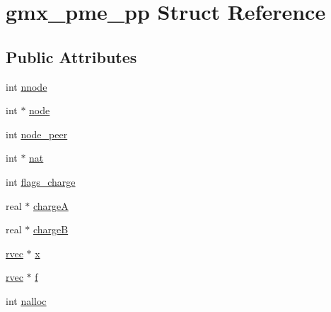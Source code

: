 \hypertarget{structgmx__pme__pp}{\section{gmx\-\_\-pme\-\_\-pp \-Struct \-Reference}
\label{structgmx__pme__pp}
}
\subsection*{\-Public \-Attributes}
\begin{DoxyCompactItemize}
\item 
int \hyperlink{structgmx__pme__pp_ab8beb115201c2ca17a30bec941a866d2}{nnode}
\item 
int $\ast$ \hyperlink{structgmx__pme__pp_a8d8cf41544555e7c99385052e2afeebd}{node}
\item 
int \hyperlink{structgmx__pme__pp_a7ae7bd537376241cf862eecf7b86a39a}{node\-\_\-peer}
\item 
int $\ast$ \hyperlink{structgmx__pme__pp_a58221d0c707a3622d907527000e6c75d}{nat}
\item 
int \hyperlink{structgmx__pme__pp_a13e02cc138161f3d52c5ca7fa4af5280}{flags\-\_\-charge}
\item 
real $\ast$ \hyperlink{structgmx__pme__pp_ac8202a8f1a26579ee141d6ecb80e35a6}{charge\-A}
\item 
real $\ast$ \hyperlink{structgmx__pme__pp_a378c9b6ed40e9091972501eee6b521d4}{charge\-B}
\item 
\hyperlink{share_2template_2gromacs_2types_2simple_8h_aa02a552a4abd2f180c282a083dc3a999}{rvec} $\ast$ \hyperlink{structgmx__pme__pp_a7edcbe9e32d13e50736c60a9f0b0382b}{x}
\item 
\hyperlink{share_2template_2gromacs_2types_2simple_8h_aa02a552a4abd2f180c282a083dc3a999}{rvec} $\ast$ \hyperlink{structgmx__pme__pp_ab340cc7c9907fb6aad9d430a73193603}{f}
\item 
int \hyperlink{structgmx__pme__pp_aa7c335c4f7c7391f42ef7ac9c207c434}{nalloc}
\end{DoxyCompactItemize}


